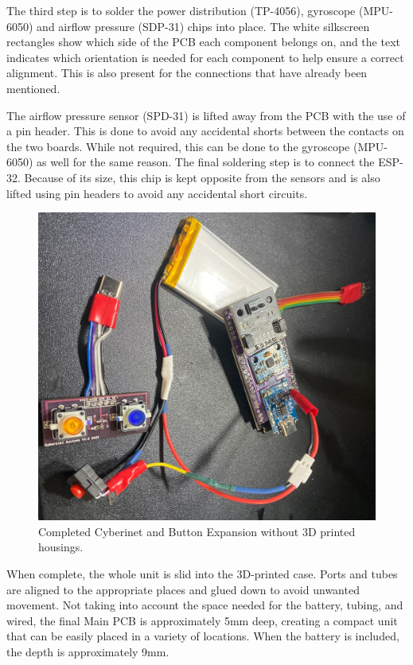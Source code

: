 The third step is to solder the power distribution (TP-4056), gyroscope (MPU-6050) and airflow pressure (SDP-31) chips into place. The white silkscreen rectangles show which side of the PCB each component belongs on, and the text indicates which orientation is needed for each component to help ensure a correct alignment. This is also present for the connections that have already been mentioned.

The airflow pressure sensor (SPD-31) is lifted away from the PCB with the use of a pin header. This is done to avoid any accidental shorts between the contacts on the two boards. While not required, this can be done to the gyroscope (MPU-6050) as well for the same reason. The final soldering step is to connect the ESP-32. Because of its size, this chip is kept opposite from the sensors and is also lifted using pin headers to avoid any accidental short circuits.

\begin{center}
    \begin{figure}
        \centering
        \includegraphics[scale=0.1, angle=90]{diagrams/builtUnits/noCase.JPG}
        \caption{Completed Cyberinet and Button Expansion without 3D printed housings.}
        \label{fig:CyberinetNoCase}
    \end{figure}
\end{center}

When complete, the whole unit is slid into the 3D-printed case. Ports and tubes are aligned to the appropriate places and glued down to avoid unwanted movement. Not taking into account the space needed for the battery, tubing, and wired, the final Main PCB is approximately 5mm deep, creating a compact unit that can be easily placed in a variety of locations. When the battery is included, the depth is approximately 9mm.

